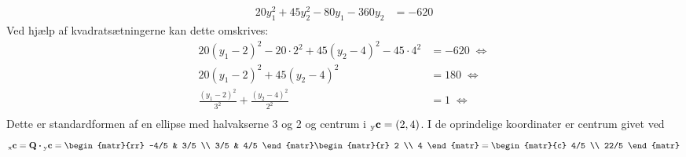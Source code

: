 \begin{example}
\begin{equation}
\begin{aligned}
20y_1^2+45y_2^2-80y_1-360y_2&=-620
\end{aligned}
\end{equation}
Ved hjælp af kvadratsætningerne kan dette omskrives:
\begin{equation}
\begin{aligned}
20(y_1-2)^2 - 20 \cdot 2^2 + 45(y_2-4)^2 - 45 \cdot 4^2 &=-620 \; \Leftrightarrow \\
20(y_1-2)^2 + 45(y_2-4)^2 &= 180 \; \Leftrightarrow \\
\frac{(y_1-2)^2}{3^2} + \frac{(y_2-4)^2}{2^2} &= 1 \; \Leftrightarrow \\
\end{aligned}
\end{equation}
Dette er standardformen af en ellipse med halvakserne 3 og 2 og centrum i $ {_\mathrm{y}\mathbf{c}} = (2,4) $. I de oprindelige koordinater er centrum givet ved
\begin{equation}
\vekind xc = \mQ \bm{\cdot} \vekind yc = \begin{matr}{rr} -4/5 & 3/5 \\ 3/5 & 4/5 \end{matr} \begin{matr}{r} 2 \\ 4 \end{matr} = \begin{matr}{c} 4/5 \\ 22/5 \end{matr}
\end{equation}


\end{example}

